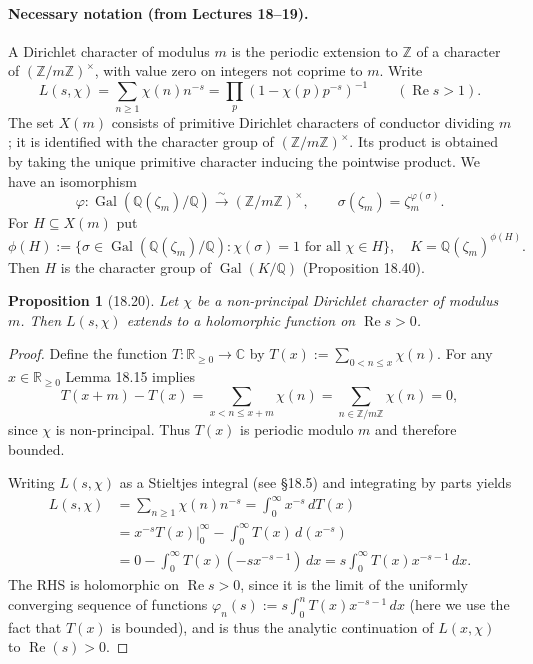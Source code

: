 \documentclass[UTF8,11pt]{ctexart}
\newtheorem*{proposition}{Proposition}
\theoremstyle{definition}
\newcommand{\R}{\mathbb R}
\newcommand{\C}{\mathbb C}
\newcommand{\Z}{\mathbb Z}
\newcommand{\Q}{\mathbb Q}
\DeclareMathOperator{\Gal}{Gal}
\begin{document}
\paragraph{Necessary notation (from Lectures 18--19).}
A Dirichlet character of modulus $m$ is the periodic extension to $\Z$ of a character of $(\Z/m\Z)^\times$, with value zero on integers not coprime to $m$. Write
\[
L(s,\chi)=\sum_{n\geq1}\chi(n)n^{-s}=\prod_p(1-\chi(p)p^{-s})^{-1}\qquad(\operatorname{Re}s>1).
\]
The set $X(m)$ consists of primitive Dirichlet characters of conductor dividing $m$; it is identified with the character group of $(\Z/m\Z)^\times$. Its product is obtained by taking the unique primitive character inducing the pointwise product. We have an isomorphism
\[
\varphi:\Gal(\Q(\zeta_m)/\Q)\xrightarrow{\sim}(\Z/m\Z)^\times,\qquad \sigma(\zeta_m)=\zeta_m^{\varphi(\sigma)}.
\]
For $H\subseteq X(m)$ put
\[
\phi(H):=\{\sigma\in\Gal(\Q(\zeta_m)/\Q):\chi(\sigma)=1\text{ for all }\chi\in H\},
\quad K=\Q(\zeta_m)^{\phi(H)}.
\]
Then $H$ is the character group of $\Gal(K/\Q)$ (Proposition 18.40).
\begin{proposition}[18.20]
Let $\chi$ be a non-principal Dirichlet character of modulus $m$. Then $L(s,\chi)$ extends to a holomorphic function on $\operatorname{Re}s>0$.
\end{proposition}
\begin{proof}
Define the function $T:\R_{\geq0}\to\C$ by $T(x):=\sum_{0<n\leq x}\chi(n)$. For any $x\in\R_{\geq0}$ Lemma 18.15 implies
\[
T(x+m)-T(x)=\sum_{x<n\leq x+m}\chi(n)=\sum_{n\in\Z/m\Z}\chi(n)=0,
\]
since $\chi$ is non-principal. Thus $T(x)$ is periodic modulo $m$ and therefore bounded.

Writing $L(s,\chi)$ as a Stieltjes integral (see \S18.5) and integrating by parts yields
\begin{align*}
L(s,\chi)&=\sum_{n\geq1}\chi(n)n^{-s}=\int_0^\infty x^{-s}\,dT(x)\\
&=\left.x^{-s}T(x)\right|_0^\infty-\int_0^\infty T(x)\,d(x^{-s})\\
&=0-\int_0^\infty T(x)(-sx^{-s-1})\,dx
=s\int_0^\infty T(x)x^{-s-1}\,dx.
\end{align*}
The RHS is holomorphic on $\operatorname{Re}s>0$, since it is the limit of the uniformly converging sequence of functions $\varphi_n(s):=s\int_0^nT(x)x^{-s-1}\,dx$ (here we use the fact that $T(x)$ is bounded), and is thus the analytic continuation of $L(x,\chi)$ to $\operatorname{Re}(s)>0$.
\end{proof}
\end{document}
